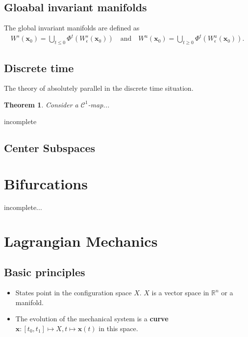 \documentclass[hidelinks,a4paper, 11pt]{article}
\theoremstyle{plain}
\newtheorem{theorem}{Theorem}
\theoremstyle{break}
\theoremstyle{plain}
\theoremstyle{definition}
\begin{document}
{\subsection{Gloabal invariant manifolds}
The global invariant manifolds are defined as
\begin{align*}
	W^s(\mathbf x_0) = \bigcup_{t \leq 0} \Phi^t(W_{\epsilon}^s(\mathbf x_0)) \quad \text{and} \quad
	W^u(\mathbf x_0) = \bigcup_{t \geq 0} \Phi^t(W_{\epsilon}^u(\mathbf x_0)).
\end{align*} 

\subsection{Discrete time}
The theory of absolutely parallel in the discrete time situation.
\begin{theorem}
	Consider a $\mathcal C^1$-map...
\end{theorem}
incomplete

\subsection{Center Subspaces}


\section{Bifurcations}

incomplete...


\section{Lagrangian Mechanics}

\subsection{Basic principles}
\begin{itemize}
	\item States point in the configuration space $X$. $X$ is a vector space in $\mathbb R^n$ or a manifold.
	
	\item The evolution of the mechanical system is a \textbf{curve} $\mathbf x: [t_0,t_1] \mapsto X, t \mapsto \mathbf x(t)$ in this space.
	

\end{itemize}}
\end{document}
